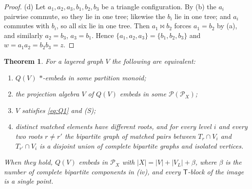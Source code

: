 \documentclass[11pt]{amsart}
\newtheorem{theorem}{Theorem}[section]
\theoremstyle{definition}
\renewcommand{\P}{\mathcal{P}}
\newcommand{\T}{\mathsf{T}}
\begin{document}
\begin{proof}
(d) Let $a_1,a_2,a_3,b_1,b_2,b_3$ be a triangle configuration. By (b) the $a_i$ pairwise commute, so they lie in one tree; likewise the $b_i$ lie in one tree; and $a_i$ commutes with $b_i$, so all six lie in one tree. Then $a_1\bowtie b_2$ forces $a_1=b_2$ by (a), and similarly $a_2=b_3$, $a_3=b_1$. Hence $\{a_1,a_2,a_3\}=\{b_1,b_2,b_3\}$ and $w=a_1a_2=b_2b_3=z$.
\end{proof}

\begin{theorem}\label{thm:layered}
For a layered graph $V$ the following are equivalent:
\begin{enumerate}[label=\textup{(\roman*)},nosep]
\item $Q(V)$ $*$-embeds in some partition monoid;
\item the projection algebra $V$ of $Q(V)$ embeds in some $\P(\P_X)$;
\item $V$ satisfies \eqref{eq:Q1} and (S);
\item distinct matched elements have different roots, and for every level $i$ and every two roots $r\ne r'$ the bipartite graph of matched pairs between $T_r\cap V_i$ and $T_{r'}\cap V_i$ is a disjoint union of complete bipartite graphs and isolated vertices.
\end{enumerate}
When they hold, $Q(V)$ embeds in $\P_X$ with $|X|=|V|+|V_L|+\beta$, where $\beta$ is the number of complete bipartite components in (iv), and every $\T$-block of the image is a single point.
\end{theorem}
\end{document}
